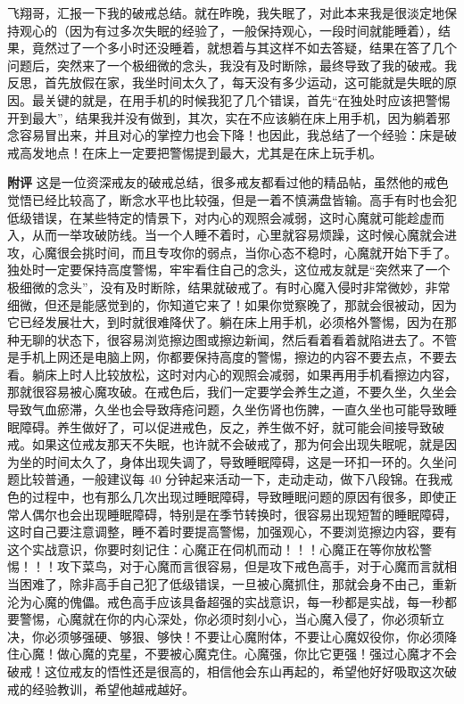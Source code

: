 \begin{case}
    飞翔哥，汇报一下我的破戒总结。就在昨晚，我失眠了，对此本来我是很淡定地保持观心的（因为有过多次失眠的经验了，一般保持观心，一段时间就能睡着），结果，竟然过了一个多小时还没睡着，就想着与其这样不如去答疑，结果在答了几个问题后，突然来了一个极细微的念头，我没有及时断除，最终导致了我的破戒。我反思，首先放假在家，我坐时间太久了，每天没有多少运动，这可能就是失眠的原因。最关键的就是，在用手机的时候我犯了几个错误，首先“在独处时应该把警惕开到最大”，结果我并没有做到，其次，实在不应该躺在床上用手机，因为躺着邪念容易冒出来，并且对心的掌控力也会下降！也因此，我总结了一个经验：床是破戒高发地点！在床上一定要把警惕提到最大，尤其是在床上玩手机。

    \textbf{附评} 这是一位资深戒友的破戒总结，很多戒友都看过他的精品帖，虽然他的戒色觉悟已经比较高了，断念水平也比较强，但是一着不慎满盘皆输。高手有时也会犯低级错误，在某些特定的情景下，对内心的观照会减弱，这时心魔就可能趁虚而入，从而一举攻破防线。当一个人睡不着时，心里就容易烦躁，这时候心魔就会进攻，心魔很会挑时间，而且专攻你的弱点，当你心态不稳时，心魔就开始下手了。独处时一定要保持高度警惕，牢牢看住自己的念头，这位戒友就是“突然来了一个极细微的念头”，没有及时断除，结果就破戒了。有时心魔入侵时非常微妙，非常细微，但还是能感觉到的，你知道它来了！如果你觉察晚了，那就会很被动，因为它已经发展壮大，到时就很难降伏了。躺在床上用手机，必须格外警惕，因为在那种无聊的状态下，很容易浏览擦边图或擦边新闻，然后看着看着就陷进去了。不管是手机上网还是电脑上网，你都要保持高度的警惕，擦边的内容不要去点，不要去看。躺床上时人比较放松，这时对内心的观照会减弱，如果再用手机看擦边内容，那就很容易被心魔攻破。在戒色后，我们一定要学会养生之道，不要久坐，久坐会导致气血瘀滞，久坐也会导致痔疮问题，久坐伤肾也伤脾，一直久坐也可能导致睡眠障碍。养生做好了，可以促进戒色，反之，养生做不好，就可能会间接导致破戒。如果这位戒友那天不失眠，也许就不会破戒了，那为何会出现失眠呢，就是因为坐的时间太久了，身体出现失调了，导致睡眠障碍，这是一环扣一环的。久坐问题比较普通，一般建议每 40 分钟起来活动一下，走动走动，做下八段锦。在我戒色的过程中，也有那么几次出现过睡眠障碍，导致睡眠问题的原因有很多，即使正常人偶尔也会出现睡眠障碍，特别是在季节转换时，很容易出现短暂的睡眠障碍，这时自己要注意调整，睡不着时要提高警惕，加强观心，不要浏览擦边内容，要有这个实战意识，你要时刻记住：心魔正在伺机而动！！！心魔正在等你放松警惕！！！攻下菜鸟，对于心魔而言很容易，但是攻下戒色高手，对于心魔而言就相当困难了，除非高手自己犯了低级错误，一旦被心魔抓住，那就会身不由己，重新沦为心魔的傀儡。戒色高手应该具备超强的实战意识，每一秒都是实战，每一秒都要警惕，心魔就在你的内心深处，你必须时刻小心，当心魔入侵了，你必须斩立决，你必须够强硬、够狠、够快！不要让心魔附体，不要让心魔奴役你，你必须降住心魔！做心魔的克星，不要被心魔克住。心魔强，你比它更强！强过心魔才不会破戒！这位戒友的悟性还是很高的，相信他会东山再起的，希望他好好吸取这次破戒的经验教训，希望他越戒越好。
\end{case}

